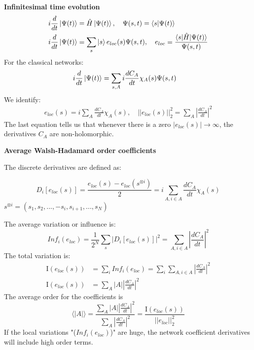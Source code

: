 \documentclass[aps,prl,preprint,groupedaddress]{revtex4-2}
\begin{document}
\textbf{Infinitesimal time evolution}
\begin{equation*}
    \begin{split}
    i\frac{d}{dt}\ket{\Psi(t)}&=\hat{H}\ket{\Psi(t)},\quad \Psi(s,t)=\braket{s|\Psi(t)}\\
    i\frac{d}{dt}\ket{\Psi(t)}&=\sum_s\ket{s} e_{loc}(s)\Psi(s,t),\quad e_{loc}= \frac{\braket{s|\hat{H}|\Psi(t)}}{\Psi(s,t)}
    \end{split} 
\end{equation*}
For the classical networks:
\begin{equation*}
    \begin{split}
    i\frac{d}{dt}\ket{\Psi(t)}&=\sum_{s,A}i\frac{dC_A}{dt}\chi_A(s)\Psi(s,t)
    \end{split} 
\end{equation*}
We identify:
\begin{equation}
    \begin{split}
        e_{loc}(s)= i \sum_A \frac{dC_A}{dt}\chi_A(s),\quad ||e_{loc}(s)||_2^2=\sum_A \left\lvert\frac{dC_A}{dt}\right\rvert^2
    \end{split}
\end{equation}
The last equation tells us that whenever there is a zero $|e_{loc}(s)| \rightarrow \infty$, the derivatives $C_A$ are non-holomorphic.


\textbf{Average Walsh-Hadamard order coefficients}


The discrete derivatives are defined as:

\begin{equation*}
    D_i[e_{loc}(s)]=
    \frac{e_{loc}(s)-e_{loc}(s^{\otimes i})}{2}=i\sum_{A,i\in A}\frac{dC_A}{dt}\chi_A(s)
\end{equation*}
$s^{\otimes i}=(s_1,s_2,...,-s_i,s_{i+1},...,s_N)$

The average variation or influence is:
\begin{equation*}
    Inf_i(e_{loc})=\frac{1}{2^N}\sum_s\left\lvert D_i[ e_{loc}(s)]\right\rvert^2=\sum_{A,i\in A}\left\lvert\frac{dC_A}{dt}\right\rvert^2
\end{equation*}
The total variation is:
\begin{equation*}
    \begin{split}
    \mathrm{I}(e_{loc}(s))&=\sum_i Inf_i(e_{loc}) = \sum_i \sum_{A,i\in A}\left\lvert\frac{dC_A}{dt}\right\rvert^2 \\
    \mathrm{I}(e_{loc}(s))&=\sum_A |A| \left\lvert\frac{dC_A}{dt}\right\rvert^2
    \end{split}
\end{equation*}
The average order for the coefficients is
\begin{equation}
    \langle |A|\rangle=\frac{\sum_A |A|\left\lvert\frac{dC_A}{dt}\right\rvert^2}{\sum_A \left\lvert\frac{dC_A}{dt}\right\rvert^2}=\frac{\mathrm{I}(e_{loc}(s))}{||e_{loc}||_2^2}
\end{equation}
If the local variations "($Inf_i(e_{loc})$)"  are huge, the network coefficient derivatives will include high order terms.
\end{document}
